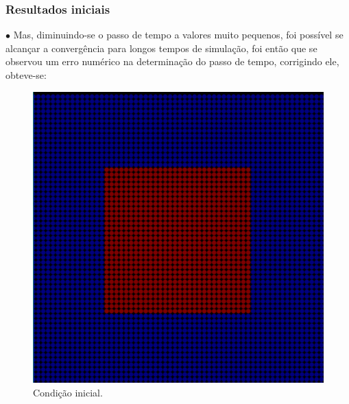 \documentclass[xcolor=dvipsnames,10pt,aspectratio=169]{beamer}
\begin{document}
	\begin{frame}
		\frametitle{Resultados iniciais}
		$\bullet$ Mas, diminuindo-se o passo de tempo a valores muito pequenos, foi possível se alcançar a convergência para longos tempos de simulação, foi então que se observou um erro numérico na determinação do passo de tempo, corrigindo ele, obteve-se:\\
		\begin{minipage}[h!]{0.30\textwidth}
			\begin{figure}[h!]
				\centering
				\includegraphics[trim = {1cm 1cm 1cm 1cm}, clip , angle=0, scale=0.3]{images/sucesso_!}
				\caption{Condição inicial.}
			\end{figure}
		\end{minipage}
		\begin{minipage}[h!]{0.30\textwidth}
			\begin{figure}[h!]
				\centering

\end{figure}
\end{minipage}
\end{frame}
\end{document}
